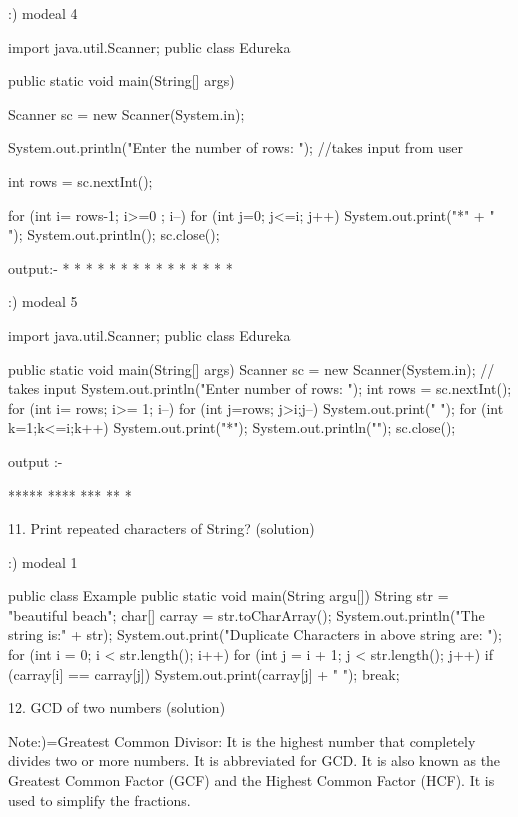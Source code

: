 :) modeal 4

import java.util.Scanner;
public class Edureka
{
    public static void main(String[] args)
    {
    Scanner sc = new Scanner(System.in);
 
    System.out.println("Enter the number of rows: "); //takes input from user
 
    int rows = sc.nextInt();
 
    for (int i= rows-1; i>=0 ; i--)
    {
    for (int j=0; j<=i; j++)
    {
    System.out.print("*" + " ");
    }
    System.out.println();
    }
    sc.close();
    }
    }
	
	output:- 
 * * * * * 
  * * * * 
   * * * 
    * * 
     * 


:) modeal 5

import java.util.Scanner;
public class Edureka
{
 
    public static void main(String[] args)
    {
    Scanner sc = new Scanner(System.in); // takes input
    System.out.println("Enter number of rows: ");
    int rows = sc.nextInt();
    for (int i= rows; i>= 1; i--)
    {
    for (int j=rows; j>i;j--)
    {
    System.out.print(" ");
    }
    for (int k=1;k<=i;k++)
    {
    System.out.print("*");
    }
    System.out.println("");
    }
    sc.close();
    }
    }
 
 output :-
 
*****
 ****
  ***
   **
    *









11. Print repeated characters of String? (solution)

 :) modeal 1
 
 public class Example {
   public static void main(String argu[]) {
      String str = "beautiful beach";
      char[] carray = str.toCharArray();
      System.out.println("The string is:" + str);
      System.out.print("Duplicate Characters in above string are: ");
      for (int i = 0; i < str.length(); i++) {
         for (int j = i + 1; j < str.length(); j++) {
            if (carray[i] == carray[j]) {
               System.out.print(carray[j] + " ");
               break;
            }
         }
      }
   }
}
 
 

12. GCD of two numbers (solution)

Note:)=Greatest Common Divisor: It is the highest number that completely divides two or more numbers.
 It is abbreviated for GCD. It is also known as the Greatest Common Factor (GCF) and the Highest Common Factor (HCF).
 It is used to simplify the fractions.
 
